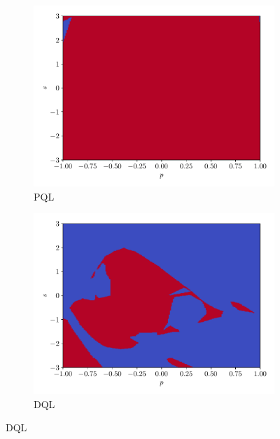 \documentclass[a4paper, 12pt]{article}
\begin{document}
    \begin{figure}[h]
        \centering
        \begin{subfigure}{0.49\textwidth}
            \centering
            \includegraphics[width=\textwidth]{resources/pdf/5_mu_PQL_Adam_normed.pdf}
            \caption{PQL}
        \end{subfigure}
        \hfill
        \begin{subfigure}{0.49\textwidth}
            \centering
            \includegraphics[width=\textwidth]{resources/pdf/5_mu_DQL_Adam_normed.pdf}
            \caption{DQL}
        \end{subfigure}
        \label{fig:parametric.q.learning.mu.normed}
    \end{figure}
    
\end{document}
